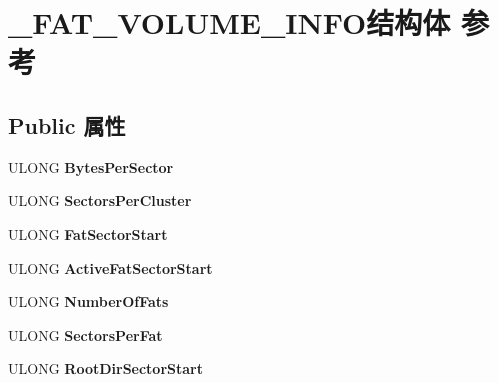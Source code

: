 \hypertarget{struct___f_a_t___v_o_l_u_m_e___i_n_f_o}{}\section{\+\_\+\+F\+A\+T\+\_\+\+V\+O\+L\+U\+M\+E\+\_\+\+I\+N\+F\+O结构体 参考}
\label{struct___f_a_t___v_o_l_u_m_e___i_n_f_o}
\subsection*{Public 属性}
\begin{DoxyCompactItemize}
\item 
\mbox{\label{struct___f_a_t___v_o_l_u_m_e___i_n_f_o_a24cee93b99f16ef35118a44a0747f1f1}} 
U\+L\+O\+NG {\bfseries Bytes\+Per\+Sector}
\item 
\mbox{\label{struct___f_a_t___v_o_l_u_m_e___i_n_f_o_a12e41b9c062ccaafa46113b1b44dcec2}} 
U\+L\+O\+NG {\bfseries Sectors\+Per\+Cluster}
\item 
\mbox{\label{struct___f_a_t___v_o_l_u_m_e___i_n_f_o_a586067ccb86660cac04999ccfbb07517}} 
U\+L\+O\+NG {\bfseries Fat\+Sector\+Start}
\item 
\mbox{\label{struct___f_a_t___v_o_l_u_m_e___i_n_f_o_aba32ec7c8eab76fb40aa956a7e387677}} 
U\+L\+O\+NG {\bfseries Active\+Fat\+Sector\+Start}
\item 
\mbox{\label{struct___f_a_t___v_o_l_u_m_e___i_n_f_o_ae8c882c2d6d06a3f6c45e3770d556040}} 
U\+L\+O\+NG {\bfseries Number\+Of\+Fats}
\item 
\mbox{\label{struct___f_a_t___v_o_l_u_m_e___i_n_f_o_ae09111e50ea207719d32f1c36646a1d4}} 
U\+L\+O\+NG {\bfseries Sectors\+Per\+Fat}
\item 
\mbox{\label{struct___f_a_t___v_o_l_u_m_e___i_n_f_o_aad715257d6d41037a8e82b55cde676a2}} 
U\+L\+O\+NG {\bfseries Root\+Dir\+Sector\+Start}
\item 

\end{DoxyCompactItemize}
